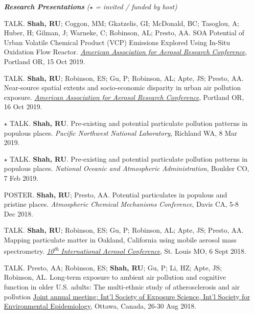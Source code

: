 \documentclass{article}
\begin{document}
\hrulefill
\textit{\textbf{  Research Presentations} ({\Large $\star$} = invited / funded by host)  }
\hrulefill
\begin{etaremune}
\item {\tiny TALK.} \textbf{Shah, RU}; Coggon, MM; Gkatzelis, GI; McDonald, BC; Tasoglou, A; Huber, H; Gilman, J; Warneke, C; Robinson, AL; Presto, AA. SOA Potential of Urban Volatile Chemical Product (VCP) Emissions Explored Using In-Situ Oxidation Flow Reactor. \href{http://aaarabstracts.com/2019/viewabstract.php?pid=329}{\textit{American Association for Aerosol Research Conference}}, Portland OR, 15 Oct 2019.
\item {\tiny TALK.} \textbf{Shah, RU};  Robinson, ES; Gu, P; Robinson, AL; Apte, JS; Presto, AA. Near-source spatial extents and socio-economic disparity in urban air pollution exposure. \href{http://aaarabstracts.com/2019/viewabstract.php?pid=322}{\textit{American Association for Aerosol Research Conference}}, Portland OR, 16 Oct 2019.
\item {\Large $\star$} {\tiny TALK.} \textbf{Shah, RU}. Pre-existing and potential particulate pollution patterns in populous places. \textit{Pacific Northwest National Laboratory}, Richland WA, 8 Mar 2019.
\item {\Large $\star$} {\tiny TALK.} \textbf{Shah, RU}. Pre-existing and potential particulate pollution patterns in populous places. \textit{National Oceanic and Atmospheric Administration}, Boulder CO, 7 Feb 2019.
\item {\tiny POSTER.} \textbf{Shah, RU}; Presto, AA. Potential particulates in populous and pristine places. \textit{Atmospheric Chemical Mechanisms Conference}, Davis CA, 5-8 Dec 2018.
\item {\tiny TALK.} \textbf{Shah, RU}; Robinson, ES; Gu, P; Robinson, AL; Apte, JS; Presto, AA. Mapping particulate matter in Oakland, California using mobile aerosol mass spectrometry. \href{http://aaarabstracts.com/2018IAC/viewabstract.php?pid=1032}{\textit{10\textsuperscript{th} International Aerosol Conference}}, St. Louis MO, 6 Sept 2018.
\item {\tiny TALK.} Presto, AA; Robinson, ES; \textbf{Shah, RU}; Gu, P; Li, HZ; Apte, JS; Robinson, AL. 
Long-term exposure to ambient air pollution and cognitive function in older U.S. adults: The multi-ethnic study of atherosclerosis and air pollution \href{https://ehp.niehs.nih.gov/doi/10.1289/isesisee.2018.P03.1430}{Joint annual meeting: Int'l Society of Exposure Science, Int'l Society for Environmental Epidemiology}, Ottawa, Canada, 26-30 Aug 2018.

\end{etaremune}
\end{document}
